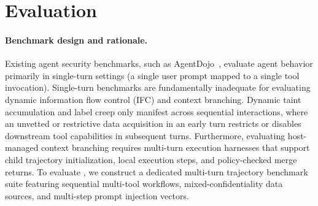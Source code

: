 \section{Evaluation}\label{sec:evaluation}


\paragraph{Benchmark design and rationale.}
Existing agent security benchmarks, such as AgentDojo~\cite{debenedettiAgentDojoDynamicEnvironment2024}, evaluate agent behavior primarily in single-turn settings (a single user prompt mapped to a single tool invocation). Single-turn benchmarks are fundamentally inadequate for evaluating dynamic information flow control (IFC) and context branching. Dynamic taint accumulation and label creep only manifest across sequential interactions, where an unvetted or restrictive data acquisition in an early turn restricts or disables downstream tool capabilities in subsequent turns. Furthermore, evaluating host-managed context branching requires multi-turn execution harnesses that support child trajectory initialization, local execution steps, and policy-checked merge returns. To evaluate \appa{}, we construct a dedicated multi-turn trajectory benchmark suite featuring sequential multi-tool workflows, mixed-confidentiality data sources, and multi-step prompt injection vectors.


